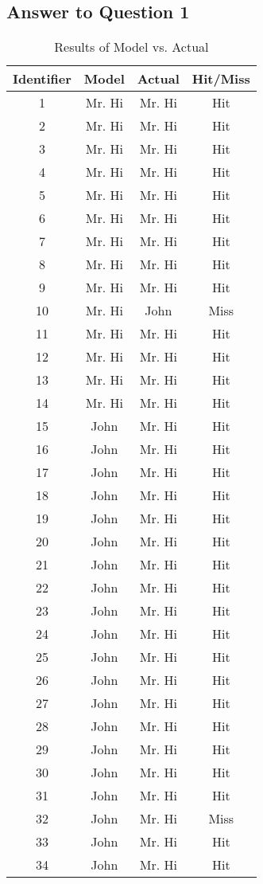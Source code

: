 \documentclass{article}
\begin{document}
\subsection*{Answer to Question 1}



\begin{table}[!h]
\centering
\caption{Results of Model vs. Actual}
\begin{tabular}{c c c c}
\hline
Identifier & Model &  Actual & Hit/Miss \\
\hline
\hline
1 & Mr. Hi & Mr. Hi & Hit \\
2 & Mr. Hi & Mr. Hi & Hit \\
3 & Mr. Hi & Mr. Hi & Hit \\
4 & Mr. Hi & Mr. Hi & Hit \\
5 & Mr. Hi & Mr. Hi & Hit \\
6 & Mr. Hi & Mr. Hi & Hit \\
7 & Mr. Hi & Mr. Hi & Hit \\
8 & Mr. Hi & Mr. Hi & Hit \\
9 & Mr. Hi & Mr. Hi & Hit \\
10 & Mr. Hi & John & Miss \\
11 & Mr. Hi & Mr. Hi & Hit \\
12 & Mr. Hi & Mr. Hi & Hit \\
13 & Mr. Hi & Mr. Hi & Hit \\
14 & Mr. Hi & Mr. Hi & Hit \\
15 & John & Mr. Hi & Hit \\
16 & John & Mr. Hi & Hit \\
17 & John & Mr. Hi & Hit \\
18 & John & Mr. Hi & Hit \\
19 & John & Mr. Hi & Hit \\
20 & John & Mr. Hi & Hit \\
21 & John & Mr. Hi & Hit \\
22 & John & Mr. Hi & Hit \\
23 & John & Mr. Hi & Hit \\
24 & John & Mr. Hi & Hit \\
25 & John & Mr. Hi & Hit \\
26 & John & Mr. Hi & Hit \\
27 & John & Mr. Hi & Hit \\
28 & John & Mr. Hi & Hit \\
29 & John & Mr. Hi & Hit \\
30 & John & Mr. Hi & Hit \\
31 & John & Mr. Hi & Hit \\
32 & John & Mr. Hi & Miss \\
33 & John & Mr. Hi & Hit \\
34 & John & Mr. Hi & Hit \\
\hline
\end{tabular}
\end{table}
\end{document}
